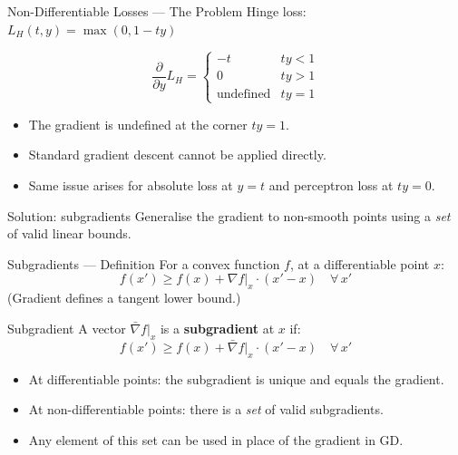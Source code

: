 \begin{frame}{Non-Differentiable Losses — The Problem}
  Hinge loss: $L_H(t,y)=\max(0,1-ty)$

  \[
    \frac{\partial}{\partial y}L_H =
    \begin{cases}
      -t & ty < 1 \\
      0  & ty > 1 \\
      \text{undefined} & ty = 1
    \end{cases}
  \]

  \begin{itemize}
    \item The gradient is \alert{undefined} at the corner $ty=1$.
    \item Standard gradient descent cannot be applied directly.
    \item Same issue arises for absolute loss at $y=t$ and perceptron loss at $ty=0$.
  \end{itemize}

  \vspace{.4em}
  \begin{block}{Solution: subgradients}
    Generalise the gradient to non-smooth points using a \emph{set} of valid linear bounds.
  \end{block}
\end{frame}

\begin{frame}{Subgradients — Definition}
  For a convex function $f$, at a differentiable point $x$:
  \[
    f(x') \geq f(x) + \nabla f|_x \cdot (x'-x) \quad \forall\, x'
  \]
  (Gradient defines a tangent lower bound.)

  \vspace{.5em}
  \begin{block}{Subgradient}
    A vector $\bar\nabla f|_x$ is a \textbf{subgradient} at $x$ if:
    \[
      f(x') \geq f(x) + \bar\nabla f|_x \cdot (x'-x) \quad \forall\, x'
    \]
  \end{block}

  \begin{itemize}
    \item At differentiable points: the subgradient is unique and equals the gradient.
    \item At non-differentiable points: there is a \emph{set} of valid subgradients.
    \item Any element of this set can be used in place of the gradient in GD.
  \end{itemize}
\end{frame}

